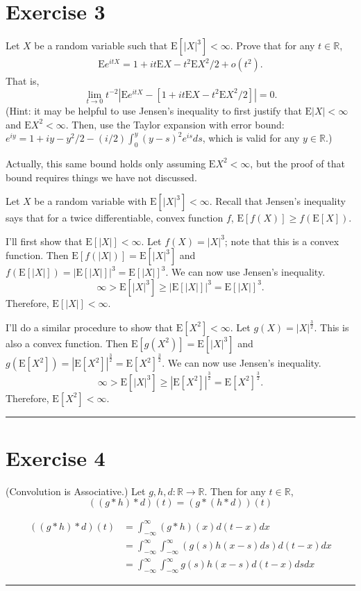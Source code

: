 \documentclass{article}
\theoremstyle{break}
\newenvironment{solution}{{\bf Solution:}}{\hfill\rule{2mm}{2mm}}
\renewenvironment{proof}{{\bf Proof:}}{\hfill\rule{2mm}{2mm}}
\newcommand{\E}{\mathrm{E}}
\newcommand{\R}{\mathbb{R}}
\begin{document}
\section*{Exercise 3}
Let $X$ be a random variable such that $\E[ |X|^{3}] <\infty$.  Prove that for any $t\in\R$,
\begin{align*}
\E e^{itX}=1+it\E X-t^{2}\E X^{2}/2+o(t^{2}).
\end{align*}
That is,
$$\lim_{t \rightarrow 0}t^{-2} |\E e^{itX}-[1+it\E X-t^{2}\E X^{2}/2]|=0.$$
(Hint: it may be helpful to use Jensen's inequality to first justify that $\E |X|<\infty$ and $\E X^{2}<\infty$.  Then, use the Taylor expansion with error bound: $e^{iy}=1+iy-y^{2}/2-(i/2)\int_{0}^{y}(y-s)^{2}e^{is}ds$, which is valid for any $y\in\R$.)

Actually, this same bound holds only assuming $\E X^{2}<\infty$, but the proof of that bound requires things we have not discussed.

\begin{solution}
Let $X$ be a random variable with $\E[|X|^3] < \infty$. Recall that Jensen's inequality says that for a twice differentiable, convex function $f$, $\E[f(X)] \geq f(\E[X])$.

I'll first show that $\E[|X|] < \infty$. Let $f(X) = |X|^3$; note that this is a convex function. 
Then $\E[f(|X|)] = \E[|X|^3]$ and $f(\E[|X|]) = |\E[|X|]|^3 = \E[|X|]^3$. We can now use Jensen's inequality. 
\[ \infty > \E[|X|^3] \geq |\E[|X|]|^3 = \E[|X|]^3.\]
Therefore, $\E[|X|] < \infty$.

I'll do a similar procedure to show that $\E[X^2] < \infty$. Let $g(X) = |X|^\frac{3}{2}$. This is also a convex function. Then $\E[g(X^2)] = \E[|X|^3]$ and $g(\E[X^2]) = |\E[X^2]|^\frac{3}{2} = \E[X^2]^\frac{3}{2}$. We can now use Jensen's inequality. 
\[ \infty > \E[|X|^3] \geq |\E[X^2]|^\frac{3}{2} = \E[X^2]^\frac{3}{2}.\]
Therefore, $\E[X^2] < \infty$.



\end{solution}


\section*{Exercise 4}
(Convolution is Associative.)
Let $g,h,d\colon\R\to\R$.  Then for any $t\in\R$,
$$((g*h)*d)(t)=(g*(h*d))(t)$$


\begin{proof}

\begin{align*}
((g \ast h) \ast d)(t)&= \int_{-\infty}^\infty (g \ast h)(x) d(t-x) dx \\
	&= \int_{-\infty}^\infty \int_{-\infty}^\infty (g(s) h(x-s) ds ) d(t-x) dx \\
	&= \int_{-\infty}^\infty \int_{-\infty}^\infty g(s) h(x-s) d(t-x) ds dx
\end{align*}

\end{proof}
\end{document}
